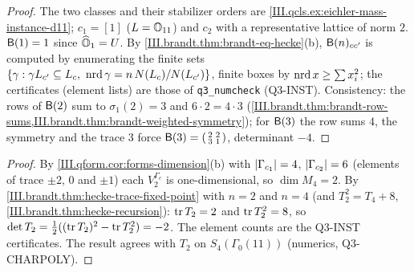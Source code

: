\begin{example}[Brandt matrices for $D=11$]
\end{example}
\begin{proof}
The two classes and their stabilizer orders are \cref{III.qcls.ex:eichler-mass-instance-d11}; $c_1=[1]$ ($L=\mathbb{O}_{11}$) and $c_2$ with a representative lattice of
norm $2$. $\mathsf{B}(1)=1$ since $\widehat{\mathbb{O}}_1=U$. By \cref{III.brandt.thm:brandt-eq-hecke}(b), $\mathsf{B}(n)_{cc'}$ is computed by enumerating the
finite sets $\{\gamma:\gamma L_{c'}\subseteq L_c,\ \operatorname{nrd}\gamma=n\,N(L_c)/N(L_{c'})\}$, finite boxes by $\operatorname{nrd} x\ge\sum x_i^2$; the certificates
(element lists) are those of \texttt{q3\_numcheck} (Q3-INST). Consistency: the rows of $\mathsf{B}(2)$ sum to $\sigma_1(2)=3$ and $6\cdot2=4\cdot3$
(\cref{III.brandt.thm:brandt-row-sums,III.brandt.thm:brandt-weighted-symmetry}); for $\mathsf{B}(3)$ the row sums $4$, the symmetry and the trace $3$ force
$\mathsf{B}(3)=\begin{psmallmatrix}2&2\\3&1\end{psmallmatrix}$, determinant $-4$.
\end{proof}

\begin{example}[weight $4$ for $D=11$ (stretch)]
\end{example}
\begin{proof}
By \cref{III.qform.cor:forms-dimension}(b) with $\lvert\Gamma_{c_1}\rvert=4$, $\lvert\Gamma_{c_2}\rvert=6$ (elements of trace $\pm2$, $0$ and $\pm1$) each $V_2^{\Gamma_c}$ is
one-dimensional, so $\dim M_4=2$. By \cref{III.brandt.thm:hecke-trace-fixed-point} with $n=2$ and $n=4$ (and $T_2^2=T_4+8$,
\cref{III.brandt.thm:hecke-recursion}): $\operatorname{tr} T_2=2$ and $\operatorname{tr} T_2^2=8$, so $\det T_2=\frac12((\operatorname{tr} T_2)^2-\operatorname{tr} T_2^2)=-2$. The element counts are the
Q3-INST certificates. The result agrees with $T_2$ on $S_4(\Gamma_0(11))$ (numerics, Q3-CHARPOLY).
\end{proof}
